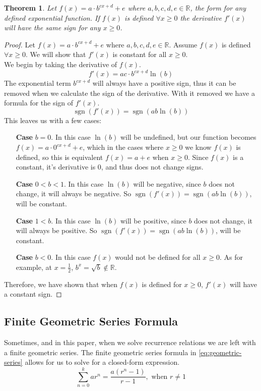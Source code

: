 \documentclass{article}
\newtheorem{theorem}{Theorem}[section]
\DeclareMathOperator{\sgn}{sgn}
\begin{document}
\begin{theorem}\label{thm:1}\normalfont
    Let $f(x)=a \cdot b^{cx+d} + e$ where $a, b, c, d, e \in \mathbb{R}$, the form for any defined exponential function. If $f(x)$ is defined $\forall x \ge 0$ the derivative $f'(x)$ will have the same sign for any $x \ge 0$.
\end{theorem}
\begin{proof}
    Let $f(x)=a \cdot b^{cx+d} + e$ where $a, b, c, d, e \in \mathbb{R}$. Assume $f(x)$ is defined $\forall x \ge 0$. We will show that $f'(x)$ is constant for all $x \ge 0$.\\
    We begin by taking the derivative of $f(x)$.
    $$
        f'(x) = ac \cdot b^{cx+d} \ln(b)
    $$
    The exponential term $b^{cx+d}$ will always have a positive sign, thus it can be removed when we calculate the sign of the derivative. With it removed we have a formula for the sign of $f'(x)$. 
    $$
        \sgn(f'(x))=\sgn(ab\ln(b))
    $$
    This leaves us with a few cases:
    \begin{itemize}
        \item[\textbf{Case}] $b = 0$. In this case $\ln(b)$ will be undefined, but our function becomes $f(x)=a \cdot 0^{cx+d} + e$, which in the cases where $x \ge 0$ we know $f(x)$ is defined, so this is equivalent $f(x) = a + e$ when $x \ge 0$. Since $f(x)$ is a constant, it's derivative is 0, and thus does not change signs.
        \item[\textbf{Case}] $0 < b < 1$. In this case $\ln(b)$ will be negative, since $b$ does not change, it will always be negative. So $\sgn(f'(x))=\sgn(ab\ln(b))$, will be constant.
        \item[\textbf{Case}] $1 < b$. In this case $\ln(b)$ will be positive, since $b$ does not change, it will always be positive. So $\sgn(f'(x))=\sgn(ab\ln(b))$, will be constant.
        \item[\textbf{Case}] $b < 0$. In this case $f(x)$ would not be defined for all $x \ge 0$. As for example, at $x = \frac{1}{2}$, $b^x = \sqrt{b} \notin \mathbb{R}$.
    \end{itemize}

    Therefore, we have shown that when $f(x)$ is defined for $x \ge 0$, $f'(x)$ will have a constant sign.
\end{proof}

\subsection{Finite Geometric Series Formula}
Sometimes, and in this paper, when we solve recurrence relations we are left with a finite geometric series. The finite geometric series formula in \cref{eq:geometric-series} allows for us to solve for a closed-form expression.
\begin{equation}\label{eq:geometric-series}
    \sum_{n=0}^{k}ar^n = \frac{a(r^n-1)}{r-1}, \text{ when } r \ne 1
\end{equation}
\end{document}
